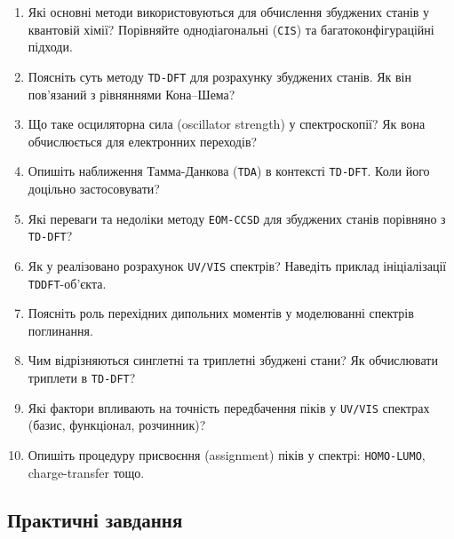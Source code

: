 \begin{enumerate}
    \item Які основні методи використовуються для обчислення збуджених станів у квантовій хімії? Порівняйте однодіагональні (\texttt{CIS}) та багатоконфігураційні підходи.
    \item Поясніть суть методу \texttt{TD-DFT} для розрахунку збуджених станів. Як він пов'язаний з рівняннями Кона--Шема?
    \item Що таке осциляторна сила (oscillator strength) у спектроскопії? Як вона обчислюється для електронних переходів?
    \item Опишіть наближення Тамма-Данкова (\texttt{TDA}) в контексті \texttt{TD-DFT}. Коли його доцільно застосовувати?
    \item Які переваги та недоліки методу \texttt{EOM-CCSD} для збуджених станів порівняно з \texttt{TD-DFT}?
    \item Як у \PySCF{} реалізовано розрахунок \texttt{UV/VIS} спектрів? Наведіть приклад ініціалізації \texttt{TDDFT}-об'єкта.
    \item Поясніть роль перехідних дипольних моментів у моделюванні спектрів поглинання.
    \item Чим відрізняються синглетні та триплетні збуджені стани? Як обчислювати триплети в \texttt{TD-DFT}?
    \item Які фактори впливають на точність передбачення піків у \texttt{UV/VIS} спектрах (базис, функціонал, розчинник)?
    \item Опишіть процедуру присвоєння (assignment) піків у спектрі: \texttt{HOMO-LUMO}, charge-transfer тощо.
\end{enumerate}

\subsection*{Практичні завдання}

